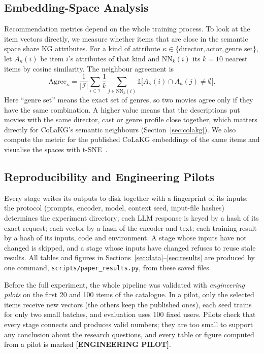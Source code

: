 \documentclass[a4paper,11pt]{article}
\begin{document}
\subsection{Embedding-Space Analysis}
Recommendation metrics depend on the whole training process. To look at the item vectors directly, we measure whether items that are close in the semantic space share KG attributes. For a kind of attribute $\kappa\in\{\text{director}, \text{actor}, \text{genre set}\}$, let $A_\kappa(i)$ be item $i$'s attributes of that kind and $\mathrm{NN}_k(i)$ its $k=10$ nearest items by cosine similarity. The neighbour agreement is
\begin{equation}
\mathrm{Agree}_\kappa = \frac{1}{|\mathcal{I}|}\sum_{i\in\mathcal{I}}\frac{1}{k}\sum_{j\in\mathrm{NN}_k(i)}\mathbb{1}\big[A_\kappa(i)\cap A_\kappa(j)\neq\emptyset\big].
\end{equation}
Here ``genre set'' means the exact set of genres, so two movies agree only if they have the same combination. A higher value means that the descriptions put movies with the same director, cast or genre profile close together, which matters directly for CoLaKG's semantic neighbours (Section~\ref{sec:colakg}). We also compute the metric for the published CoLaKG embeddings of the same items and visualise the spaces with t-SNE~\cite{maaten2008tsne}.

\subsection{Reproducibility and Engineering Pilots}
Every stage writes its outputs to disk together with a fingerprint of its inputs: the protocol (prompts, encoder, model, context seed, input-file hashes) determines the experiment directory; each LLM response is keyed by a hash of its exact request; each vector by a hash of the encoder and text; each training result by a hash of its inputs, code and environment. A stage whose inputs have not changed is skipped, and a stage whose inputs have changed refuses to reuse stale results. All tables and figures in Sections~\ref{sec:data}--\ref{sec:results} are produced by one command, \texttt{scripts/paper\_results.py}, from these saved files.

Before the full experiment, the whole pipeline was validated with \emph{engineering pilots} on the first 20 and 100 items of the catalogue. In a pilot, only the selected items receive new vectors (the others keep the published ones), each seed trains for only two small batches, and evaluation uses 100 fixed users. Pilots check that every stage connects and produces valid numbers; they are too small to support any conclusion about the research questions, and every table or figure computed from a pilot is marked \textbf{[ENGINEERING PILOT]}.
\end{document}
